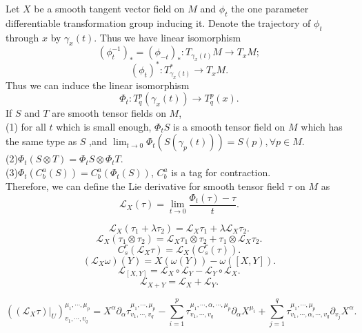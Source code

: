 \begin{newdef}
Let $X$ be a smooth tangent vector field on $M$ and $\phi_t$ the one parameter differentiable transformation group inducing it. Denote the trajectory of $\phi_t$ through $x$ by $\gamma_x(t)$. Thus we have linear isomorphism
\[(\phi_t^{-1})_{*} = (\phi_{-t})_{*} : T_{\gamma_x(t)}M \to T_xM;\]
\[(\phi_t)^* : T_{\gamma_x(t)}^* \to T_xM.\]
Thus we can induce the linear isomorphism
\[\Phi_t: T^p_q(\gamma_x(t)) \to T^p_q(x).\]
If $S$ and $T$ are smooth tensor fields on $M$,\\
(1) for all $t$ which is small enough, $\Phi_tS$ is a smooth tensor field on $M$ which has the same type as $S$ ,and $\lim_{t \to 0} \Phi_t(S(\gamma_p(t))) = S(p),\forall p \in M$.\\
(2)$\Phi_t(S \otimes T) = \Phi_tS \otimes \Phi_tT$.\\
(3)$\Phi_t(C^a_b(S)) = C^a_b(\Phi_t(S))$, $C^a_b$ is a tag for contraction.\\
Therefore, we can define the Lie derivative for smooth tensor field $\tau$ on $M$ as
\[\mathscr{L}_{X}(\tau) = \lim_{t \to 0}\frac{\Phi_t(\tau)-\tau}{t}.\]
\end{newdef}

\begin{newprop}
\[\mathscr{L}_X(\tau_1+\lambda \tau_2) = \mathscr{L}_X \tau_1 + \lambda \mathscr{L}_X \tau_2.\]
\[\mathscr{L}_X(\tau_1 \otimes \tau_2) = \mathscr{L}_X\tau_1 \otimes \tau_2 + \tau_1 \otimes \mathscr{L}_X \tau_2.\]
\[C^r_s(\mathscr{L}_X \tau) = \mathscr{L}_X(C^r_s(\tau)).\]
\[(\mathscr{L}_X \omega)(Y) = X(\omega(Y)) - \omega([X,Y]).\]
\[\mathscr{L}_{[X,Y]} = \mathscr{L}_X \circ \mathscr{L}_Y - \mathscr{L}_Y \circ \mathscr{L}_X .\]
\[\mathscr{L}_{X+Y} = \mathscr{L}_{X} + \mathscr{L}_{Y}.\]
\end{newprop}

\begin{newprop}
\[((\mathscr{L}_X \tau)|_U)^{\mu_1,\cdots,\mu_p}_{v_1,\cdots,v_q} = X^{\alpha} \partial_{\alpha} \tau^{\mu_1,\cdots,\mu_p}_{v_1,\cdots,v_q} - \sum_{i=1}^{p} \tau^{\mu_1,\cdots,\alpha,\cdots,\mu_p}_{v_1,\cdots,v_q} \partial_{\alpha} X^{\mu_i} + \sum_{j=1}^{q}\tau^{\mu_1,\cdots,\mu_p}_{v_1,\cdots,\alpha,\cdots,v_q} \partial_{v_j}X^{\alpha}.\]
\end{newprop}

